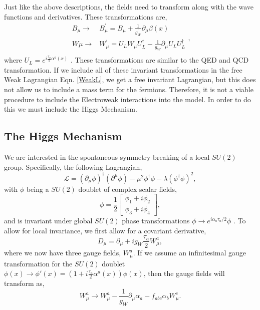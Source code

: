  Just like the above descriptions, the fields need to transform along with the wave functions and derivatives. These transformations are,
\begin{equation}
\begin{split}
B_\mu\rightarrow&B^\prime_\mu=B_\mu+\frac{1}{g_W^\prime}\partial_\mu\beta(x) \\
W\mu\rightarrow&W^\prime_\mu=U_L W_\mu U^\dagger_L-\frac{1}{g_W}\partial_\mu U_L U_L^\dagger \\
\end{split},
\end{equation}
where $U_L=e^{i\frac{\tau_a}{2}\alpha^a(x)}$ \cite{halzen_quarks_1984, griffiths_introduction_2008}. These transformations are similar to the QED and QCD transformation. If we include all of these invariant transformations in the free Weak Lagrangian Eqn. \ref{WeakL}, we get a free invariant Lagrangian, but this does not allow us to include a mass term for the fermions. Therefore, it is not a viable procedure to include the Electroweak interactions into the model. In order to do this we must include the Higgs Mechanism.

\subsection{The Higgs Mechanism}\label{HiggsMechanism}

We are interested in the spontaneous symmetry breaking of a local $SU(2)$ group. Specifically, the following Lagrangian,
\begin{equation}\label{HiggsLagrangian}
\mathcal{L}=(\partial_\mu\phi)^\dagger(\partial^\mu\phi)-\mu^2\phi^\dagger\phi-\lambda(\phi^\dagger\phi)^2,
\end{equation}
with $\phi$ being a $SU(2)$ doublet of complex scalar fields,
\begin{equation}
\phi=\frac{1}{2}
\begin{bmatrix}
\phi_1+i\phi_2 \\
\phi_3+i\phi_4
\end{bmatrix},
\end{equation} 
and is invariant under global $SU(2)$ phase transformations $\phi\rightarrow e^{i\alpha_a\tau_a/2}\phi$ \cite{halzen_quarks_1984}. To allow for local invariance, we first allow for a covariant derivative,
\begin{equation}
D_\mu=\partial_\mu+ig_W \frac{\tau_a}{2}W_\mu^a,
\end{equation}
where we now have three gauge fields, $W_\mu^a$. If we assume an infinitesimal gauge transformation for the $SU(2)$ doublet $\phi(x)\rightarrow\phi'(x)=(1 +i\frac{\tau_a}{2}\alpha^a(x))\phi(x)$, then the gauge fields will transform as,
\begin{equation}\label{HiggVectorTransform}
W^a_\mu\rightarrow W^a_\mu-\frac{1}{g_W}\partial_\mu\alpha_a-f_{abc}\alpha_bW^c_\mu.
\end{equation}

